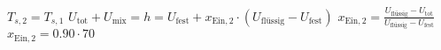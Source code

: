 \( T_{s,2} = T_{s,1} \)  
\( U_{\text{tot}} + U_{\text{mix}} = h = U_{\text{fest}} + x_{\text{Ein},2} \cdot (U_{\text{flüssig}} - U_{\text{fest}}) \)  
\( x_{\text{Ein},2} = \frac{U_{\text{flüssig}} - U_{\text{tot}}}{U_{\text{flüssig}} - U_{\text{fest}}} \)  
\( x_{\text{Ein},2} = 0.90 \cdot 70 \)